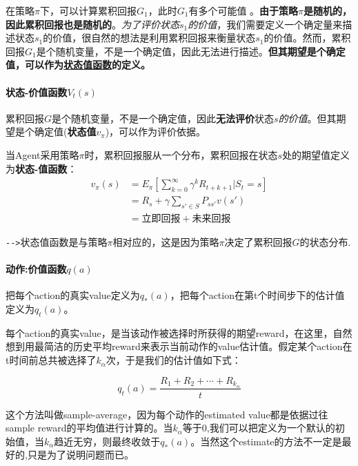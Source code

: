\documentclass[UTF8,a4paper,12pt]{ctexbook}
\begin{document}
				在策略$\pi$下，可以计算累积回报$G_1$，此时$G_1$有多个可能值 。\textbf{由于策略}$\pi$\textbf{是随机的，因此累积回报也是随机的}。\textit{为了评价状态}$s_1$\textit{的价值}，我们需要定义一个确定量来描述状态$s_1$的价值，很自然的想法是利用累积回报来衡量状态$s_1$的价值。然而，累积回报$G_1$是个随机变量，不是一个确定值，因此无法进行描述。\textbf{但其期望是个确定值，可以作为\underline{状态值函数}的定义。}
				
			
			\paragraph{状态-价值函数$V_t(s)$}
			
				累积回报$G$是个随机变量，不是一个确定值，因此\textbf{无法评价}状态$s$\textit{的价值}。但其期望是个确定值(\textbf{状态值}$v_\pi$)，可以作为评价依据。
			
				当Agent采用策略$\pi$时，累积回报服从一个分布，累积回报在状态$s$处的期望值定义为\textbf{状态-值函数}：
				\begin{equation}
					\begin{aligned}
						v_\pi(s) &= E_\pi \left[\sum_{k=0}^{\infty}\gamma^k R_{t+k+1}|S_t = s \right]	\\
							&= R_s + \gamma \sum_{s' \in S}P_{ss'}v(s') \\
							&= \textit{立即回报} + \textit{未来回报}
					\end{aligned}
				\end{equation}
				
				\verb|-->|状态值函数是与策略$\pi$相对应的，这是因为策略$\pi$决定了累积回报$G$的状态分布.
			
			\paragraph{动作:价值函数$q(a)$}
				把每个action的真实value定义为$q_*(a)$，把每个action在第t个时间步下的估计值定义为$q_t(a)$。
				
				每个action的真实value，是当该动作被选择时所获得的期望reward，在这里，自然想到用最简洁的历史平均reward来表示当前动作的value估计值。假定某个action在t时间前总共被选择了$k_\alpha$次，于是我们的估计值如下式：
			
				$$q_t(a) = \dfrac{R_1 + R_2 + \cdots + R_{k_\alpha}}{t}$$
				
				这个方法叫做sample-average，因为每个动作的estimated value都是依据过往sample reward的平均值进行计算的。当$k_\alpha$等于0,我们可以把定义为一个默认的初始值，当$k_\alpha$趋近无穷，则最终收敛于$q_*(a)$。当然这个estimate的方法不一定是最好的,只是为了说明问题而已。
				
\end{document}
